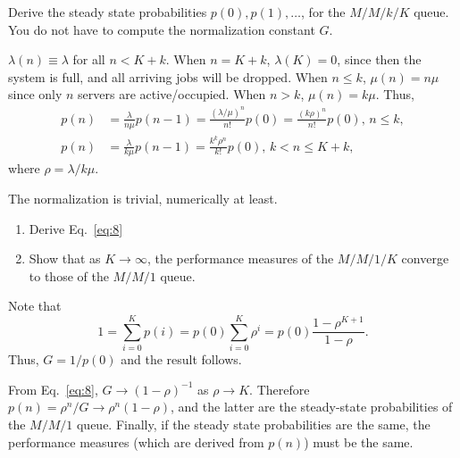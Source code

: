 \begin{question}
  Derive the steady state probabilities $p(0), p(1), \ldots$, for the
  $M/M/k/K$ queue. You do not have to compute the normalization
  constant $G$.
  \begin{solution}
    $\lambda(n) \equiv \lambda$ for all $n<K+k$. When $n=K+k$,
    $\lambda(K)=0$, since then the system is full, and all arriving
    jobs will be dropped.  When $n\leq k$, $\mu(n)=n \mu$ since only $n$
    servers are active/occupied. When $n> k$, $\mu(n) = k
    \mu$. Thus,
    \begin{align*}
      p(n) &= \frac{\lambda}{n\mu} p(n-1) = \frac{(\lambda/\mu)^n}{n!} p(0)=\frac{(k\rho)^n}{n!}p(0), \, n\leq k, \\
      p(n) &= \frac{\lambda}{k\mu} p(n-1) = \frac{k^k \rho^n}{k!} p(0), \, k<n\leq K+k,
    \end{align*}
where $\rho = \lambda/k \mu$.  

The normalization is trivial, numerically at least.
  \end{solution}
\end{question}



\begin{question}
  \begin{enumerate}
  \item Derive Eq.~\eqref{eq:8}
  \item   Show that as $K\to\infty$, the performance measures of the $M/M/1/K$ converge to those of the $M/M/1$ queue. 
  \end{enumerate}
  \begin{solution}
Note that 
\begin{equation*}
1 = \sum_{i=0}^K p(i) = p(0)\sum_{i=0}^K \rho^i  = p(0) \frac{1-\rho^{K+1}}{1-\rho}. 
\end{equation*}
Thus, $G=1/p(0)$ and the result follows. 

    From Eq.~\eqref{eq:8}, $G\to (1-\rho)^{-1}$ as $\rho\to K$.
    Therefore $p(n)=\rho^n/G \to \rho^n(1-\rho)$, and the latter are
    the steady-state probabilities of the $M/M/1$ queue. Finally, if
    the steady state probabilities are the same, the performance
    measures (which are derived from $p(n)$) must be the same.
  \end{solution}
\end{question}

